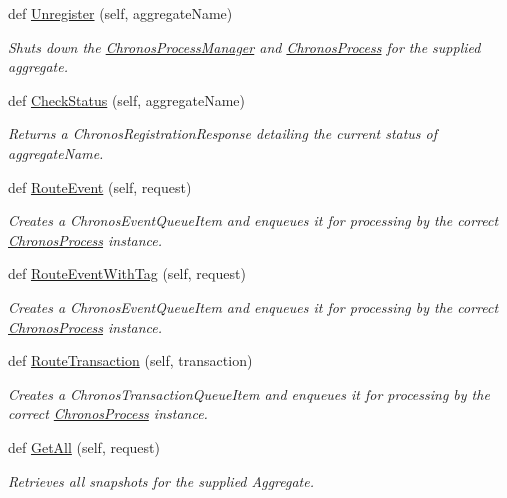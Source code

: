 \begin{DoxyCompactItemize}
def \hyperlink{group__Chronos_gaf1f7b9953b7fd0e2ef47e55405c66acc}{Unregister} (self, aggregate\+Name)
\begin{DoxyCompactList}\small\item\em Shuts down the \hyperlink{classChronos_1_1Gateway_1_1ChronosProcessManager}{Chronos\+Process\+Manager} and \hyperlink{classChronos_1_1Gateway_1_1ChronosProcess}{Chronos\+Process} for the supplied aggregate. \end{DoxyCompactList}\item 
def \hyperlink{group__Chronos_ga9355f09e2f692b2d379033d69d5a02fa}{Check\+Status} (self, aggregate\+Name)
\begin{DoxyCompactList}\small\item\em Returns a Chronos\+Registration\+Response detailing the current status of {\ttfamily aggregate\+Name}. \end{DoxyCompactList}\item 
def \hyperlink{group__Chronos_gacbe9f7549ce9b5f11f2cb3d4dca74638}{Route\+Event} (self, request)
\begin{DoxyCompactList}\small\item\em Creates a Chronos\+Event\+Queue\+Item and enqueues it for processing by the correct \hyperlink{classChronos_1_1Gateway_1_1ChronosProcess}{Chronos\+Process} instance. \end{DoxyCompactList}\item 
def \hyperlink{group__Chronos_gaea90e7dc86d552e1e9f9b66d47858d37}{Route\+Event\+With\+Tag} (self, request)
\begin{DoxyCompactList}\small\item\em Creates a Chronos\+Event\+Queue\+Item and enqueues it for processing by the correct \hyperlink{classChronos_1_1Gateway_1_1ChronosProcess}{Chronos\+Process} instance. \end{DoxyCompactList}\item 
def \hyperlink{group__Chronos_gaa906b0081fb403254dc6fcc4d718629f}{Route\+Transaction} (self, transaction)
\begin{DoxyCompactList}\small\item\em Creates a Chronos\+Transaction\+Queue\+Item and enqueues it for processing by the correct \hyperlink{classChronos_1_1Gateway_1_1ChronosProcess}{Chronos\+Process} instance. \end{DoxyCompactList}\item 
def \hyperlink{group__Chronos_gab8200236e0e382a3f1fa576190267513}{Get\+All} (self, request)
\begin{DoxyCompactList}\small\item\em Retrieves all snapshots for the supplied Aggregate. \end{DoxyCompactList}\item 

\end{DoxyCompactItemize}
